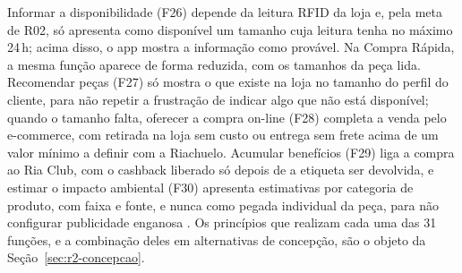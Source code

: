 Informar a disponibilidade (F26) depende da leitura RFID da loja e, pela meta de R02, só apresenta como disponível um tamanho cuja leitura tenha no máximo 24\,h; acima disso, o app mostra a informação como provável. Na Compra Rápida, a mesma função aparece de forma reduzida, com os tamanhos da peça lida. Recomendar peças (F27) só mostra o que existe na loja no tamanho do perfil do cliente, para não repetir a frustração de indicar algo que não está disponível; quando o tamanho falta, oferecer a compra on-line (F28) completa a venda pelo e-commerce, com retirada na loja sem custo ou entrega sem frete acima de um valor mínimo a definir com a Riachuelo. Acumular benefícios (F29) liga a compra ao Ria Club, com o cashback liberado só depois de a etiqueta ser devolvida, e estimar o impacto ambiental (F30) apresenta estimativas por categoria de produto, com faixa e fonte, e nunca como pegada individual da peça, para não configurar publicidade enganosa \cite{brasil1990cdc}. Os princípios que realizam cada uma das 31 funções, e a combinação deles em alternativas de concepção, são o objeto da Seção~\ref{sec:r2-concepcao}.
